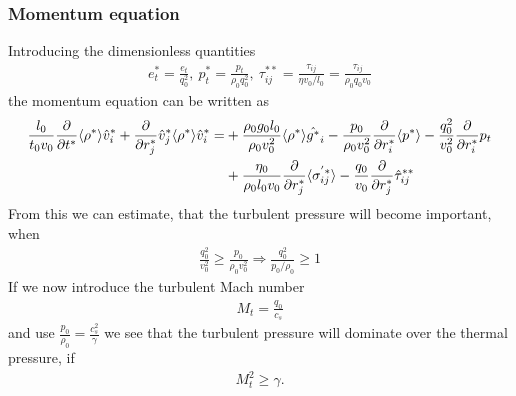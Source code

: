 \subsubsection{Momentum equation}\label{dimmom}
Introducing the dimensionless quantities
\begin{align}
e_t^*= \frac{e_t}{q^2_0},\ 
p_t^*=\frac{p_t}{\rho_0 q^2_0},\ 
\tau_{ij}^{**}=\frac{\tau_{ij}}{\eta v_0/l_0}= \frac{\tau_{ij}}{\rho_0 q_0 v_0}
\end{align}
the momentum equation can be written as
\begin{align}
\frac{l_0}{t_0 v_0}\frac{\partial}{\partial t^*}\langle \rho^* \rangle\hat{v}^*_i
+\frac{\partial}{\partial r_j^*}\hat{v}^*_j\langle \rho^* \rangle \hat { v } ^*_i=&
+\frac{\rho_0 g_0 l_0}{\rho_0 v_0^2}\langle \rho^* \rangle\hat{g^*}_i
-\frac{p_0}{\rho_0 v_0^2}\frac{\partial}{\partial r^*_i}\langle p^* \rangle
-\frac{q_0^2}{v_0^2}\frac{\partial}{\partial r^*_i}p_t\\
&+\frac{\eta_0}{\rho_0 l_0 v_0 }\frac{\partial}{\partial r_j^*}\langle \sigma^{'*}_{ij} \rangle
-\frac{q_0}{v_0}\frac{\partial}{\partial r^*_j}\hat{\tau}^{**}_{ij}
\end{align}
From this we can estimate, that the turbulent pressure will become important,
when
\begin{align}
\frac{q_0^2}{v_0^2} \geq \frac{p_0}{\rho_0 v_0^2} \Rightarrow
\frac{q_0^2}{p_0/\rho_0} \geq 1
\end{align}
If we now introduce the turbulent Mach number 
\begin{align}
M_t=\frac{q_0}{c_s}
\end{align}
and use $\frac{p_0}{\rho_0} = \frac{c_s^2}{\gamma}$ we see that the turbulent
pressure will dominate over the thermal pressure, if
\begin{align}
M_t^2 \geq \gamma.
\end{align}

